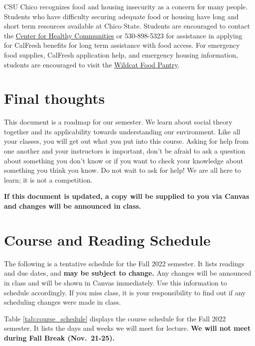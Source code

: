 \documentclass[11pt,]{article}
\begin{document}
CSU Chico recognizes food and housing insecurity as a concern for many
people. Students who have difficulty securing adequate food or housing
have long and short term resources available at Chico State. Students
are encouraged to contact the
\href{https://www.csuchico.edu/chc/}{Center for Healthy Communities} or
530-898-5323 for assistance in applying for CalFresh benefits for long
term assistance with food access. For emergency food supplies, CalFresh
application help, and emergency housing information, students are
encouraged to visit the
\href{https://www.csuchico.edu/basic-needs/pantry.shtml}{Wildcat Food
Pantry}.

\hypertarget{final-thoughts}{%
\section{Final thoughts}\label{final-thoughts}}

This document is a roadmap for our semester. We learn about social
theory together and its applicability towards understanding our
environment. Like all your classes, you will get out what you put into
this course. Asking for help from one another and your instructors is
important, don't be afraid to ask a question about something you don't
know or if you want to check your knowledge about something you think
you know. Do not wait to ask for help! We are all here to learn; it is
not a competition.

\textbf{If this document is updated, a copy will be supplied to you via
Canvas and changes will be announced in class.}

\newpage

\renewcommand{\arraystretch}{1.25}

\hypertarget{course-and-reading-schedule}{%
\section{Course and Reading
Schedule}\label{course-and-reading-schedule}}

The following is a tentative schedule for the Fall 2022 semester. It
lists readings and due dates, and \textbf{may be subject to change.} Any
changes will be announced in class and will be shown in Canvas
immediately. Use this information to schedule accordingly. If you miss
class, it is your responsibility to find out if any scheduling changes
were made in class.

Table \ref{tab:course_schedule} displays the course schedule for the
Fall 2022 semester. It lists the days and weeks we will meet for
lecture. \textbf{We will not meet during Fall Break (Nov.~21-25).}
\end{document}
